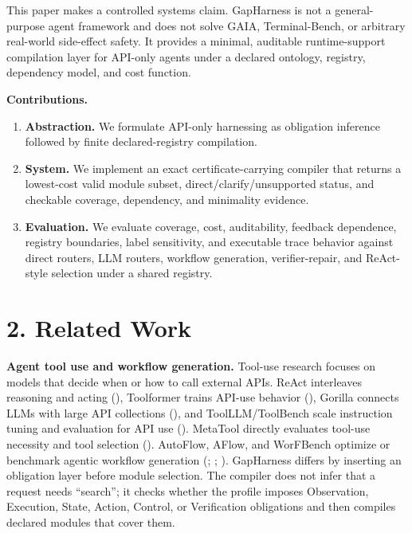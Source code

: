 \documentclass[
  10pt,
]{article}
\providecommand{\tightlist}{%
  \setlength{\itemsep}{0pt}\setlength{\parskip}{0pt}}
\begin{document}
This paper makes a controlled systems claim. GapHarness is not a
general-purpose agent framework and does not solve GAIA, Terminal-Bench,
or arbitrary real-world side-effect safety. It provides a minimal,
auditable runtime-support compilation layer for API-only agents under a
declared ontology, registry, dependency model, and cost function.

\textbf{Contributions.}

\begin{enumerate}
\def\labelenumi{\arabic{enumi}.}
\tightlist
\item
  \textbf{Abstraction.} We formulate API-only harnessing as obligation
  inference followed by finite declared-registry compilation.
\item
  \textbf{System.} We implement an exact certificate-carrying compiler
  that returns a lowest-cost valid module subset,
  direct/clarify/unsupported status, and checkable coverage, dependency,
  and minimality evidence.
\item
  \textbf{Evaluation.} We evaluate coverage, cost, auditability,
  feedback dependence, registry boundaries, label sensitivity, and
  executable trace behavior against direct routers, LLM routers,
  workflow generation, verifier-repair, and ReAct-style selection under
  a shared registry.
\end{enumerate}

\section{2. Related Work}\label{related-work}

\textbf{Agent tool use and workflow generation.} Tool-use research
focuses on models that decide when or how to call external APIs. ReAct
interleaves reasoning and acting (), Toolformer trains API-use behavior
(), Gorilla
connects LLMs with large API collections
(), and
ToolLLM/ToolBench scale instruction tuning and evaluation for API use
(). MetaTool directly
evaluates tool-use necessity and tool selection
(). AutoFlow, AFlow,
and WorFBench optimize or benchmark agentic workflow generation
(;
;
). GapHarness differs
by inserting an obligation layer before module selection. The compiler
does not infer that a request needs ``search''; it checks whether the
profile imposes Observation, Execution, State, Action, Control, or
Verification obligations and then compiles declared modules that cover
them.
\end{document}

